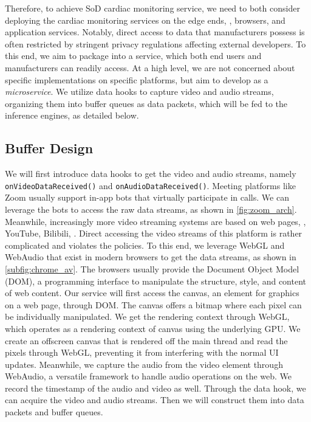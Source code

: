 Therefore, to achieve SoD cardiac monitoring service, we need to both consider deploying the cardiac monitoring services on the edge ends, \eg, browsers, and application services. Notably, direct access to data that manufacturers possess is often restricted by stringent privacy regulations affecting external developers. 
To this end, we aim to package \sysname into a service, which both end users and manufacturers can readily access. 
At a high level, we are not concerned about specific implementations on specific platforms, but aim to develop \sysname as a \textit{microservice}. We utilize data hooks to capture video and audio streams, organizing them into buffer queues as data packets, which will be fed to the inference engines, as detailed below. 

\subsection{Buffer Design}
\label{subsec: buffer}
 We will first introduce data hooks to get the video and audio streams, namely \texttt{onVideoDataReceived()} and \texttt{onAudioDataReceived()}. Meeting platforms like Zoom usually support in-app bots that virtually participate in calls. We can leverage the bots to access the raw data streams, as shown in \fig\ref{fig:zoom_arch}. Meanwhile, increasingly more video streaming systems are based on web pages, \eg, YouTube, Bilibili, \etc. Direct accessing the video streams of this platform is rather complicated and violates the policies. To this end, we leverage WebGL and WebAudio that exist in modern browsers to get the data streams, as shown in \fig\ref{subfig:chrome_av}. The browsers usually provide the Document Object Model (DOM), a programming interface to manipulate the structure, style, and content of web content. Our service will first access the canvas, an element for graphics on a web page, through DOM. 
The canvas offers a bitmap where each pixel can be individually manipulated. We get the rendering context through WebGL, which operates as a rendering context of canvas using the underlying GPU. We create an offscreen canvas that is rendered off the main thread and read the pixels through WebGL, preventing it from interfering with the normal UI updates. Meanwhile, we capture the audio from the video element through WebAudio, a versatile framework to handle audio operations on the web. We record the timestamp of the audio and video as well. Through the data hook, we can acquire the video and audio streams. Then we will construct them into data packets and buffer queues.

